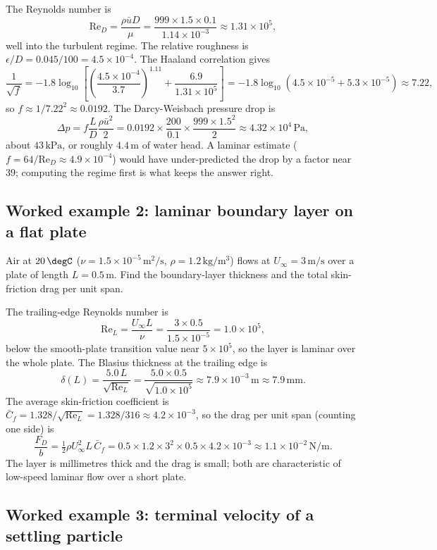 The Reynolds number is
\[
\text{Re}_D = \frac{\rho \bar u D}{\mu} = \frac{999\times1.5\times
0.1}{1.14\times10^{-3}} \approx 1.31\times10^{5},
\]
well into the turbulent regime. The relative roughness is
$\epsilon/D = 0.045/100 = 4.5\times10^{-4}$. The Haaland correlation
gives
\[
\frac{1}{\sqrt{f}} = -1.8\log_{10}\!\left[
\left(\frac{4.5\times10^{-4}}{3.7}\right)^{1.11} +
\frac{6.9}{1.31\times10^{5}}\right]
= -1.8\log_{10}(4.5\times10^{-5} + 5.3\times10^{-5}) \approx 7.22,
\]
so $f \approx 1/7.22^2 \approx 0.0192$. The Darcy-Weisbach pressure
drop is
\[
\Delta p = f\frac{L}{D}\frac{\rho \bar u^2}{2} = 0.0192\times
\frac{200}{0.1}\times\frac{999\times1.5^2}{2} \approx 4.32\times10^4
\,\si{\pascal},
\]
about $43\,\text{kPa}$, or roughly $4.4\,\si{\meter}$ of water
head. A laminar estimate ($f = 64/\text{Re}_D \approx 4.9\times
10^{-4}$) would have under-predicted the drop by a factor near
$39$; computing the regime first is what keeps the answer right.

\subsection*{Worked example 2: laminar boundary layer on a flat plate}

Air at $20\,\degC$ ($\nu = 1.5\times10^{-5}\,\si{\meter}^2/\si{
\second}$, $\rho = 1.2\,\si{\kilogram\per\meter\cubed}$) flows at
$U_\infty = 3\,\si{\meter\per\second}$ over a plate of length
$L = 0.5\,\si{\meter}$. Find the boundary-layer thickness and the
total skin-friction drag per unit span.

The trailing-edge Reynolds number is
\[
\text{Re}_L = \frac{U_\infty L}{\nu} = \frac{3\times0.5}{1.5\times
10^{-5}} = 1.0\times10^{5},
\]
below the smooth-plate transition value near $5\times10^5$, so the
layer is laminar over the whole plate. The Blasius thickness at the
trailing edge is
\[
\delta(L) = \frac{5.0\,L}{\sqrt{\text{Re}_L}} = \frac{5.0\times0.5}{
\sqrt{1.0\times10^{5}}} \approx 7.9\times10^{-3}\,\si{\meter}
\approx 7.9\,\si{\milli\meter}.
\]
The average skin-friction coefficient is $\bar C_f = 1.328/\sqrt{
\text{Re}_L} = 1.328/316 \approx 4.2\times10^{-3}$, so the
drag per unit span (counting one side) is
\[
\frac{F_D}{b} = \tfrac12\rho U_\infty^2 L\,\bar C_f =
0.5\times1.2\times3^2\times0.5\times4.2\times10^{-3} \approx
1.1\times10^{-2}\,\si{\newton\per\meter}.
\]
The layer is millimetres thick and the drag is small; both are
characteristic of low-speed laminar flow over a short plate.

\subsection*{Worked example 3: terminal velocity of a settling particle}

